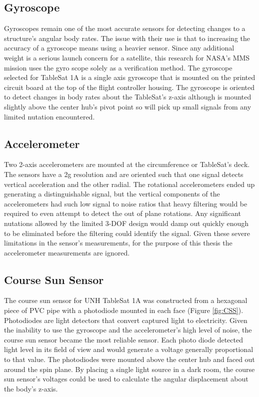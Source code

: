 \subsection{Gyroscope}
\label{subsec:Gyroscope}

Gyroscopes remain one of the most accurate sensors for detecting changes to a structure's angular body rates.  The issue with their use is that to increasing the accuracy of a gyroscope means using a heavier sensor.  Since any additional weight is a serious launch concern for a satellite, this research for NASA's MMS mission uses the gyro scope solely as a verification method.  The gyroscope selected for TableSat 1A is a single axis gyroscope that is mounted on the printed circuit board at the top of the flight controller housing.  The gyroscope is oriented to detect changes in body rates about the TableSat's z-axis although is mounted slightly above the center hub's pivot point so will pick up small signals from any limited nutation encountered.

\subsection{Accelerometer}
\label{subsec:Accelerometer}

Two 2-axis accelerometers are mounted at the circumference or TableSat's deck.  The sensors have a 2g resolution and are oriented such that one signal detects vertical acceleration and the other radial.  The rotational accelerometers ended up generating a distinguishable signal, but the vertical components of the accelerometers had such low signal to noise ratios that heavy filtering would be required to even attempt to detect the out of plane rotations.  Any significant nutations allowed by the limited 3-DOF design would damp out quickly enough to be eliminated before the filtering could identify the signal.  Given these severe limitations in the sensor's measurements, for the purpose of this thesis the accelerometer measurements are ignored.

\subsection{Course Sun Sensor}
\label{subsec:CourseSunSensor}

The course sun sensor for UNH TableSat 1A was constructed from a hexagonal piece of PVC pipe with a photodiode mounted in each face (Figure \ref{fig:CSS}).  Photodiodes are light detectors that convert captured light to electricity.  Given the inability to use the gyroscope and the accelerometer's high level of noise, the course sun sensor became the most reliable sensor.  Each photo diode detected light level in its field of view and would generate a voltage generally proportional to that value.  The photodiodes were mounted above the center hub and faced out around the spin plane.  By placing a single light source in a dark room, the course sun sensor's voltages could be used to calculate the angular displacement about the body's z-axis.


